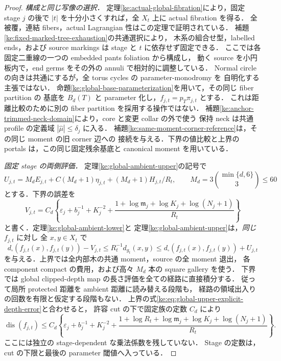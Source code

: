 \begin{proof}
\emph{構成と同じ写像の選択．}
定理\ref{ke:actual-global-fibration}により，固定 stage $j$ の後で
$|t|$ を十分小さくすれば，全 $X_t$ 上に actual fibration を得る．
全被覆，連結 fibers，actual Lagrangian 性はこの定理で証明されている．
補題\ref{ke:fixed-marked-tree-exhaustion}の共通選択により，
木系の組合せ型，labelled ends，および source markings は stage と $t$ に依存せず固定できる．
ここでは各固定二重線の一つの embedded pants foliation から構成し，
動く source を小円板内で，end germs をその外の annuli で相対的に調整している．
Normal circle の向きは共通にするが，全 torus cycles の parameter-monodromy を
自明化する主張ではない．
命題\ref{ke:global-base-parameterization}を用いて，その同じ fiber partition の
基底を $B_d(T)$ と parameter 化し，$f_{j,t}=p_T\pi_{j,t}$ とする．
これは距離比較のために別の fiber partition を採用する操作ではない．
補題\ref{ke:anchor-trimmed-neck-domain}により，core と変更 collar の外で使う
保持 neck は共通 profile の定義域 $|\widehat\mu|\le\delta_j$ に入る．
補題\ref{ke:same-moment-corner-reference}は，その同じ moment の旧 corner 辺への
接続を与える．下界の値比較と上界の portals は，この同じ固定残余基底と
canonical moment を用いている．

\emph{固定 stage の両側評価．}
定理\ref{ke:global-ambient-upper}の記号で
\[
 U_{j,t}=M_dE_{j,t}+C(M_d+1)\eta_{j,t}
          +(M_d+1)H_{j,t}/R_t,
 \qquad M_d=3\binom{\min\{d,6\}}3\le60
\]
とする．下界の誤差を
\begin{equation}\label{ke:eq:global-realization-lower-budget}
 V_{j,t}=C_d\left\{\varepsilon_j+b_j^{-1}+K_j^{-2}
 +\frac{1+\log\mathfrak m_j+\log K_j+\log(N_j+1)}{R_t}\right\}
\end{equation}
と書く．定理\ref{ke:global-ambient-lower}と
定理\ref{ke:global-ambient-upper}は，\emph{同じ} $f_{j,t}$ に対し
全 $x,y\in X_t$ で
\[
 d_\square(f_{j,t}(x),f_{j,t}(y))-V_{j,t}
 \le R_t^{-1}d_{g_t}(x,y)
 \le d_\square(f_{j,t}(x),f_{j,t}(y))+U_{j,t}
\]
を与える．上界では全内部木の共通 moment，source の全 moment 退出，
各 component compact の費用，および高々 $M_d$ 本の square gallery を使う．
下界では global clipped-depth map の長さ評価を全ての経路に直接積分する．
従って局所 protected 距離を ambient 距離に読み替える段階も，
経路の領域出入りの回数を有限と仮定する段階もない．
上界の式\eqref{ke:eq:global-upper-explicit-depth-error}と合わせると，
許容 cut の下で固定族の定数 $C_d$ により
\begin{equation}\label{ke:eq:global-realization-explicit-cut-budget}
 \operatorname{dis}(f_{j,t})\le C_d\left\{
 \varepsilon_j+b_j^{-1}+K_j^{-2}
 +\frac{1+\log R_t+\log\mathfrak m_j+\log K_j+\log(N_j+1)}{R_t}
 \right\}.
\end{equation}
ここには独立の stage-dependent な乗法係数を残していない．
Stage の定数は，cut の下限と最後の parameter 閾値へ入っている．


\end{proof}
